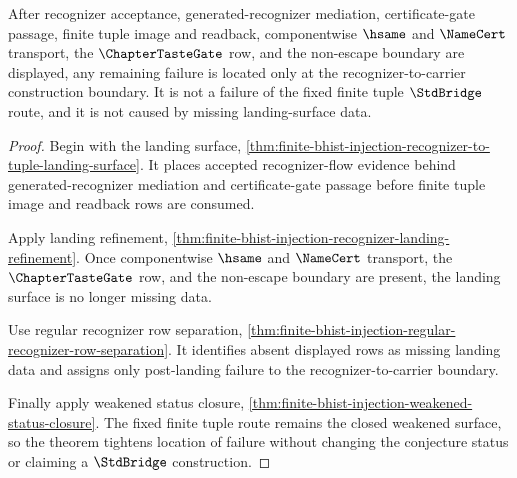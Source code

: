 \begin{theorem}
\label{thm:finite-bhist-injection-recognizer-to-carrier-status-tightening}
After recognizer acceptance, generated-recognizer mediation, certificate-gate passage, finite tuple image and readback, componentwise $\hsame$ and $\NameCert$ transport, the $\ChapterTasteGate$ row, and the non-escape boundary are displayed, any remaining failure is located only at the recognizer-to-carrier construction boundary. It is not a failure of the fixed finite tuple $\StdBridge$ route, and it is not caused by missing landing-surface data.
\end{theorem}
\begin{proof}
Begin with the landing surface, \autoref{thm:finite-bhist-injection-recognizer-to-tuple-landing-surface}. It places accepted recognizer-flow evidence behind generated-recognizer mediation and certificate-gate passage before finite tuple image and readback rows are consumed.

Apply landing refinement, \autoref{thm:finite-bhist-injection-recognizer-landing-refinement}. Once componentwise $\hsame$ and $\NameCert$ transport, the $\ChapterTasteGate$ row, and the non-escape boundary are present, the landing surface is no longer missing data.

Use regular recognizer row separation, \autoref{thm:finite-bhist-injection-regular-recognizer-row-separation}. It identifies absent displayed rows as missing landing data and assigns only post-landing failure to the recognizer-to-carrier boundary.

Finally apply weakened status closure, \autoref{thm:finite-bhist-injection-weakened-status-closure}. The fixed finite tuple route remains the closed weakened surface, so the theorem tightens location of failure without changing the conjecture status or claiming a $\StdBridge$ construction.
\end{proof}


